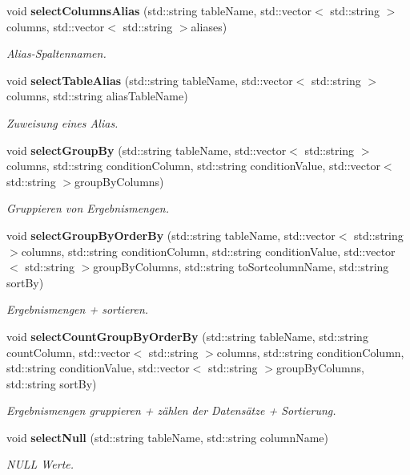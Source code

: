 \begin{DoxyCompactItemize}
void \textbf{ select\+Columns\+Alias} (std\+::string table\+Name, std\+::vector$<$ std\+::string $>$columns, std\+::vector$<$ std\+::string $>$aliases)
\begin{DoxyCompactList}\small\item\em Alias-\/\+Spaltennamen. \end{DoxyCompactList}\item 
void \textbf{ select\+Table\+Alias} (std\+::string table\+Name, std\+::vector$<$ std\+::string $>$columns, std\+::string alias\+Table\+Name)
\begin{DoxyCompactList}\small\item\em Zuweisung eines Alias. \end{DoxyCompactList}\item 
void \textbf{ select\+Group\+By} (std\+::string table\+Name, std\+::vector$<$ std\+::string $>$columns, std\+::string condition\+Column, std\+::string condition\+Value, std\+::vector$<$ std\+::string $>$group\+By\+Columns)
\begin{DoxyCompactList}\small\item\em Gruppieren von Ergebnismengen. \end{DoxyCompactList}\item 
void \textbf{ select\+Group\+By\+Order\+By} (std\+::string table\+Name, std\+::vector$<$ std\+::string $>$columns, std\+::string condition\+Column, std\+::string condition\+Value, std\+::vector$<$ std\+::string $>$group\+By\+Columns, std\+::string to\+Sortcolumn\+Name, std\+::string sort\+By)
\begin{DoxyCompactList}\small\item\em Ergebnismengen + sortieren. \end{DoxyCompactList}\item 
void \textbf{ select\+Count\+Group\+By\+Order\+By} (std\+::string table\+Name, std\+::string count\+Column, std\+::vector$<$ std\+::string $>$columns, std\+::string condition\+Column, std\+::string condition\+Value, std\+::vector$<$ std\+::string $>$group\+By\+Columns, std\+::string sort\+By)
\begin{DoxyCompactList}\small\item\em Ergebnismengen gruppieren + zählen der Datensätze + Sortierung. \end{DoxyCompactList}\item 
void \textbf{ select\+Null} (std\+::string table\+Name, std\+::string column\+Name)
\begin{DoxyCompactList}\small\item\em N\+U\+LL Werte. \end{DoxyCompactList}\item 

\end{DoxyCompactItemize}
